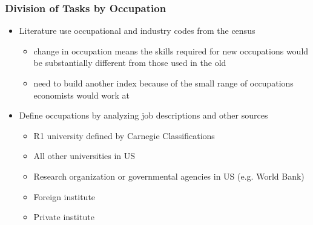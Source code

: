 \documentclass[10pt,svgnames,fragile]{beamer}
\begin{document}
{\begin{frame}[label = job_des]
	\frametitle{Division of Tasks by Occupation}
	\begin{itemize}
		\item Literature use occupational and industry codes from the census
		\begin{itemize}
			\vspace{1.5 mm}
			\item change in occupation means the skills required for new occupations would be substantially different from those used in the old 
			\vspace{1.5 mm}
			\item need to build another index because of the small range of occupations economists would work at
		\end{itemize}
\vfill
		\item Define occupations  by analyzing job descriptions and other sources
		\begin{itemize}
		\vspace{1.5 mm}
			\item R1 university defined by {\small Carnegie Classifications}
			\vspace{1.5 mm}
			\item All other universities in US
			\vspace{1.5 mm}
			\item Research organization or governmental agencies in US (e.g. World Bank)
			\vspace{1.5 mm}
			\item Foreign institute
			\vspace{1.5 mm}
			\item Private institute\\
			\vspace{1.5 mm}
			\hyperlink{NLP}{}
		\end{itemize}
\vfill
	\end{itemize}
\end{frame}



}
\end{document}

